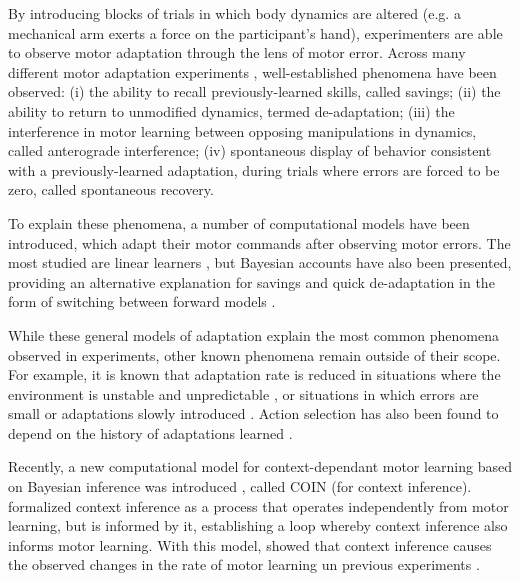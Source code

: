 \documentclass[a4paper,doc,floatsintext,natbib]{apa6}%
\begin{document}
By introducing blocks of trials in which body dynamics are altered (e.g. a mechanical arm exerts a force on the participant's hand), experimenters are able to observe motor adaptation through the lens of motor error. Across many different motor adaptation experiments \citep[e.g.][]{Gandolfo_Motor_1996,Shadmehr_Adaptive_1994,Davidson_Scaling_2004}, well-established phenomena have been observed: (i) the ability to recall previously-learned skills, called savings; (ii) the ability to return to unmodified dynamics, termed de-adaptation; (iii) the interference in motor learning between opposing manipulations in dynamics, called anterograde interference; (iv) spontaneous display of behavior consistent with a previously-learned adaptation, during trials where errors are forced to be zero, called spontaneous recovery.

To explain these phenomena, a number of computational models have been introduced, which adapt their motor commands after observing motor errors. The most studied are linear learners \citep{Smith_Interacting_2006,Forano_Timescales_2020,Scheidt_Learning_2001}, but Bayesian accounts have also been presented, providing an alternative explanation for savings and quick de-adaptation in the form of switching between forward models \citep{Kording_Bayesian_2004,Oh_Minimizing_2019}.

While these general models of adaptation explain the most common phenomena observed in experiments, other known phenomena remain outside of their scope. For example, it is known that adaptation rate is reduced in situations where the environment is unstable and unpredictable \citep{Herzfeld_memory_2014}, or situations in which errors are small \citep{Marko_Sensitivity_2012} or adaptations slowly introduced \citep{Huang_Persistence_2009}. Action selection has also been found to depend on the history of adaptations learned \citep{Vaswani_Decay_2013,Davidson_Scaling_2004}.

Recently, a new computational model for context-dependant motor learning based on Bayesian inference was introduced \cite{Heald_Contextual_2021}, called COIN (for context inference). \cite{Heald_Contextual_2021} formalized context inference as a process that operates independently from motor learning, but is informed by it, establishing a loop whereby context inference also informs motor learning. With this model, \cite{Heald_Contextual_2021} showed that context inference causes the observed changes in the rate of motor learning un previous experiments \cite[e.g.][]{Herzfeld_Encoding_2018}.
\end{document}

